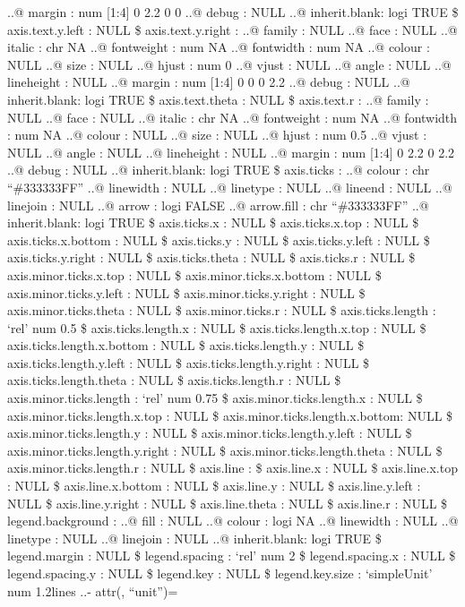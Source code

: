 \documentclass[
]{article}
\begin{document}
{..@ margin : num {[}1:4{]} 0 2.2 0 0 ..@ debug : NULL ..@ inherit.blank:
logi TRUE \$ axis.text.y.left : NULL \$ axis.text.y.right : ..@ family :
NULL ..@ face : NULL ..@ italic : chr NA ..@ fontweight : num NA ..@
fontwidth : num NA ..@ colour : NULL ..@ size : NULL ..@ hjust : num 0
..@ vjust : NULL ..@ angle : NULL ..@ lineheight : NULL ..@ margin : num
{[}1:4{]} 0 0 0 2.2 ..@ debug : NULL ..@ inherit.blank: logi TRUE \$
axis.text.theta : NULL \$ axis.text.r : ..@ family : NULL ..@ face :
NULL ..@ italic : chr NA ..@ fontweight : num NA ..@ fontwidth : num NA
..@ colour : NULL ..@ size : NULL ..@ hjust : num 0.5 ..@ vjust : NULL
..@ angle : NULL ..@ lineheight : NULL ..@ margin : num {[}1:4{]} 0 2.2
0 2.2 ..@ debug : NULL ..@ inherit.blank: logi TRUE \$ axis.ticks : ..@
colour : chr ``\#333333FF'' ..@ linewidth : NULL ..@ linetype : NULL ..@
lineend : NULL ..@ linejoin : NULL ..@ arrow : logi FALSE ..@ arrow.fill
: chr ``\#333333FF'' ..@ inherit.blank: logi TRUE \$ axis.ticks.x : NULL
\$ axis.ticks.x.top : NULL \$ axis.ticks.x.bottom : NULL \$ axis.ticks.y
: NULL \$ axis.ticks.y.left : NULL \$ axis.ticks.y.right : NULL \$
axis.ticks.theta : NULL \$ axis.ticks.r : NULL \$ axis.minor.ticks.x.top
: NULL \$ axis.minor.ticks.x.bottom : NULL \$ axis.minor.ticks.y.left :
NULL \$ axis.minor.ticks.y.right : NULL \$ axis.minor.ticks.theta : NULL
\$ axis.minor.ticks.r : NULL \$ axis.ticks.length : `rel' num 0.5 \$
axis.ticks.length.x : NULL \$ axis.ticks.length.x.top : NULL \$
axis.ticks.length.x.bottom : NULL \$ axis.ticks.length.y : NULL \$
axis.ticks.length.y.left : NULL \$ axis.ticks.length.y.right : NULL \$
axis.ticks.length.theta : NULL \$ axis.ticks.length.r : NULL \$
axis.minor.ticks.length : `rel' num 0.75 \$ axis.minor.ticks.length.x :
NULL \$ axis.minor.ticks.length.x.top : NULL \$
axis.minor.ticks.length.x.bottom: NULL \$ axis.minor.ticks.length.y :
NULL \$ axis.minor.ticks.length.y.left : NULL \$
axis.minor.ticks.length.y.right : NULL \$ axis.minor.ticks.length.theta
: NULL \$ axis.minor.ticks.length.r : NULL \$ axis.line : \$ axis.line.x
: NULL \$ axis.line.x.top : NULL \$ axis.line.x.bottom : NULL \$
axis.line.y : NULL \$ axis.line.y.left : NULL \$ axis.line.y.right :
NULL \$ axis.line.theta : NULL \$ axis.line.r : NULL \$
legend.background : ..@ fill : NULL ..@ colour : logi NA ..@ linewidth :
NULL ..@ linetype : NULL ..@ linejoin : NULL ..@ inherit.blank: logi
TRUE \$ legend.margin : NULL \$ legend.spacing : `rel' num 2 \$
legend.spacing.x : NULL \$ legend.spacing.y : NULL \$ legend.key : NULL
\$ legend.key.size : `simpleUnit' num 1.2lines ..- attr(}, ``unit'')=
\end{document}
